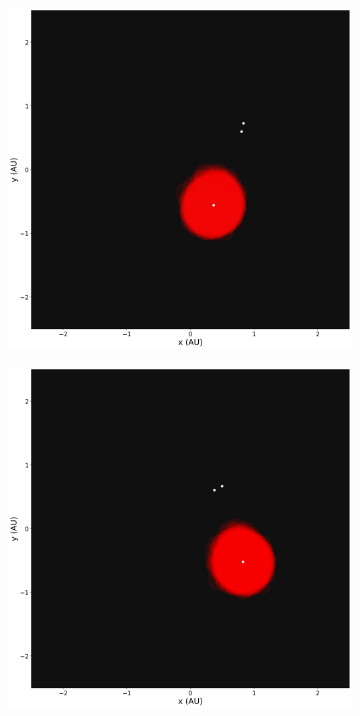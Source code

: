 \begin{figure}[H]
\begin{subfigure}[b]{0.47\textwidth}
    \end{subfigure}
    \hfill
    \begin{subfigure}[b]{0.47\textwidth}  
        \centering 
        \includegraphics[width=\textwidth]{Thesis/graphs/snapshot_0023830.png}
    \end{subfigure}
    \hfill
    \begin{subfigure}[b]{0.47\textwidth}  
        \centering 
        \includegraphics[width=\textwidth]{Thesis/graphs/snapshot_0024000.png}

\end{subfigure}
\end{figure}
